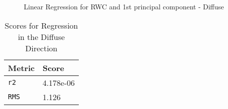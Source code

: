 \begin{figure}
    \begin{center}
    \end{center}
    \caption{Linear Regression for RWC and 1st principal component - Diffuse}
    \label{fig:polarization}
\end{figure}
%
%
\begin{table}
  \centering
  \begin{tabular}{ll}
    \toprule
    \textbf{Metric} & \textbf{Score}\\
    \midrule
      \texttt{r2} & 4.178e-06 \\
      \texttt{RMS} & 1.126 \\
    \bottomrule
  \end{tabular}
  \caption{%
    Scores for Regression in the Diffuse Direction
  }
  \label{tab:Packages}
\end{table}
